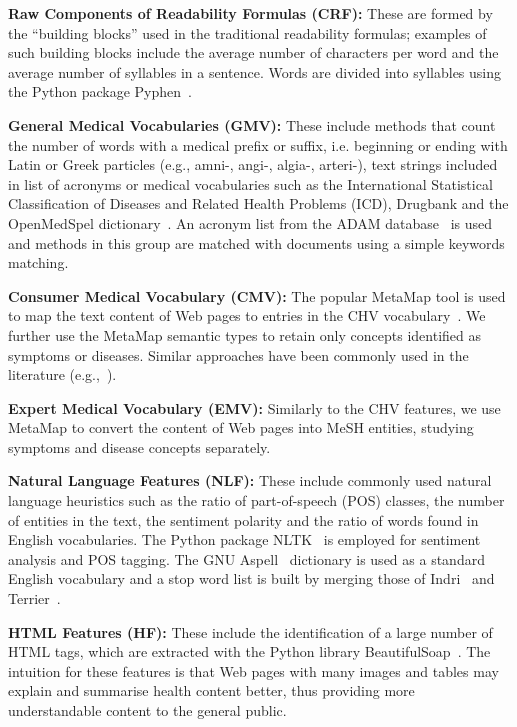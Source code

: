 \textbf{Raw Components of Readability Formulas (CRF):}
These are formed by the ``building blocks'' used in the traditional readability formulas; examples of such building blocks include the average number of characters per word and the average number of syllables in a sentence. Words are divided into syllables using the Python package Pyphen~\cite{pyphen}.

\textbf{General Medical Vocabularies (GMV):}
These include methods that count the number of words with a medical prefix or suffix, i.e. beginning or ending with Latin or Greek particles (e.g., amni-, angi-, algia-, arteri-), text strings included in list of acronyms or medical vocabularies such as the International Statistical Classification of Diseases and Related Health Problems (ICD), Drugbank and the OpenMedSpel dictionary~\cite{openmedspel}. An acronym list from the ADAM database~\cite{zhou2006} is used and methods in this group are matched with documents using a simple keywords matching.

\textbf{Consumer Medical Vocabulary (CMV):}
The popular MetaMap \cite{aronson10} tool is used to map the text content of Web pages to entries in the CHV vocabulary~\cite{zeng06}.
We further use the MetaMap semantic types to retain only concepts identified as symptoms or diseases. Similar approaches have been commonly used in the literature (e.g.,~\cite{pang16,agrafiotesA16,palotti16,yates13}).

\textbf{Expert Medical Vocabulary (EMV):}
Similarly to the CHV features, we use MetaMap to convert the content of Web pages into MeSH entities, studying symptoms and disease concepts separately. 

\textbf{Natural Language Features (NLF):}
These include commonly used natural language heuristics such as the ratio of part-of-speech (POS) classes, the number of entities in the text, the sentiment polarity and the ratio of words found in English vocabularies. The Python package NLTK~\cite{nltk} is employed for sentiment analysis and POS tagging. The GNU Aspell~\cite{aspell} dictionary is used as a standard English vocabulary and a stop word list is built by merging those of Indri~\cite{indri} and Terrier~\cite{terrier}. 

\textbf{HTML Features (HF):}
These include the identification of a large number of HTML tags, which are extracted with the Python library BeautifulSoap~\cite{bs4}. The intuition for these features is that Web pages with many images and tables may explain and summarise health content better, thus providing more understandable content to the general public. 

